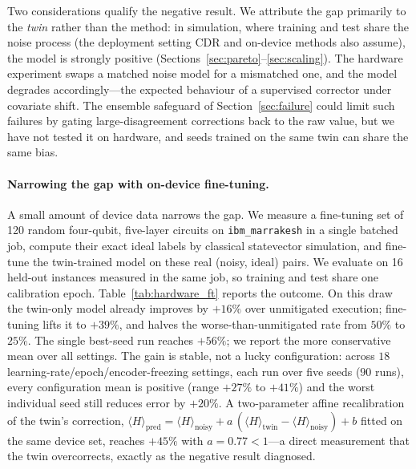\documentclass[11pt]{article}
\begin{document}
Two considerations qualify the negative result. We attribute the gap primarily to the \emph{twin} rather than the method: in simulation, where training and test share the noise process (the deployment setting CDR and on-device methods also assume), the model is strongly positive (Sections~\ref{sec:pareto}--\ref{sec:scaling}). The hardware experiment swaps a matched noise model for a mismatched one, and the model degrades accordingly---the expected behaviour of a supervised corrector under covariate shift. The ensemble safeguard of Section~\ref{sec:failure} could limit such failures by gating large-disagreement corrections back to the raw value, but we have not tested it on hardware, and seeds trained on the same twin can share the same bias.

\paragraph{Narrowing the gap with on-device fine-tuning.}
A small amount of device data narrows the gap. We measure a fine-tuning set of 120 random four-qubit, five-layer circuits on \texttt{ibm\_marrakesh} in a single batched job, compute their exact ideal labels by classical statevector simulation, and fine-tune the twin-trained model on these real (noisy, ideal) pairs. We evaluate on 16 held-out instances measured in the same job, so training and test share one calibration epoch. Table~\ref{tab:hardware_ft} reports the outcome. On this draw the twin-only model already improves by $+16\%$ over unmitigated execution; fine-tuning lifts it to $+39\%$, and halves the worse-than-unmitigated rate from $50\%$ to $25\%$. The single best-seed run reaches $+56\%$; we report the more conservative mean over all settings. The gain is stable, not a lucky configuration: across $18$ learning-rate/epoch/encoder-freezing settings, each run over five seeds ($90$ runs), every configuration mean is positive (range $+27\%$ to $+41\%$) and the worst individual seed still reduces error by $+20\%$. A two-parameter affine recalibration of the twin's correction, $\langle H\rangle_{\mathrm{pred}}=\langle H\rangle_{\mathrm{noisy}}+a\,(\langle H\rangle_{\mathrm{twin}}-\langle H\rangle_{\mathrm{noisy}})+b$ fitted on the same device set, reaches $+45\%$ with $a=0.77<1$---a direct measurement that the twin overcorrects, exactly as the negative result diagnosed.
\end{document}
